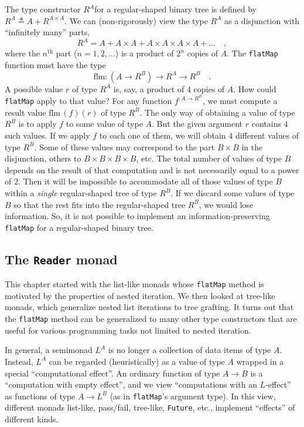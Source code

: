 The type constructor $R^{A}$for a regular-shaped binary tree is defined
by $R^{A}\triangleq A+R^{A\times A}$. We can (non-rigorously) view
the type $R^{A}$ as a disjunction with \textsf{``}infinitely many\textsf{''} parts,
\[
R^{A}=A+A\times A+A\times A\times A\times A+...\quad,
\]
where the $n^{\text{th}}$ part ($n=1,2,...$) is a product of $2^{n}$
copies of $A$. The \lstinline!flatMap! function must have the type
\[
\text{flm}:(A\rightarrow R^{B})\rightarrow R^{A}\rightarrow R^{B}\quad.
\]
A possible value $r$ of type $R^{A}$ is, say, a product of $4$
copies of $A$. How could \lstinline!flatMap! apply to that value?
For any function $f^{:A\rightarrow R^{B}}$, we must compute a result
value $\text{flm}\,(f)(r)$ of type $R^{B}$. The only way of obtaining
a value of type $R^{B}$ is to apply $f$ to some value of type $A$.
But the given argument $r$ contains $4$ such values. If we apply
$f$ to each one of them, we will obtain $4$ different values of
type $R^{B}$. Some of these values may correspond to the part $B\times B$
in the disjunction, others to $B\times B\times B\times B$, etc. The
total number of values of type $B$ depends on the result of that
computation and is not necessarily equal to a power of $2$. Then
it will be impossible to accommodate all of those values of type $B$
within a \emph{single} regular-shaped tree of type $R^{B}$. If we
discard some values of type $B$ so that the rest fits into the regular-shaped
tree $R^{B}$, we would lose information. So, it is not possible to
implement an information-preserving \lstinline!flatMap! for a regular-shaped
binary tree.

\subsection{The \texttt{Reader} monad}

This chapter started
with the list-like monads whose \lstinline!flatMap! method is motivated
by the properties of nested iteration. We then looked at tree-like
monads, which generalize nested list iterations to tree grafting.
It turns out that the \lstinline!flatMap! method can be generalized
to many other type constructors that are useful for various programming
tasks not limited to nested iteration.

In general, a semimonad $L^{A}$ is no longer a collection of data
items of type $A$. Instead, $L^{A}$ can be regarded (heuristically)
as a value of type $A$ wrapped in a special \textsf{``}computational effect\textsf{''}.
An ordinary function of type $A\rightarrow B$ is a \textsf{``}computation
with empty effect\textsf{''}, and we view \textsf{``}computations with an $L$-effect\textsf{''}
as functions of type $A\rightarrow L^{B}$ (as in \lstinline!flatMap!\textsf{'}s
argument type). In this view, different monads \textemdash{} list-like,
pass/fail, tree-like, \lstinline!Future!, etc., \textemdash{} implement
\textsf{``}effects\textsf{''} of different kinds. 

